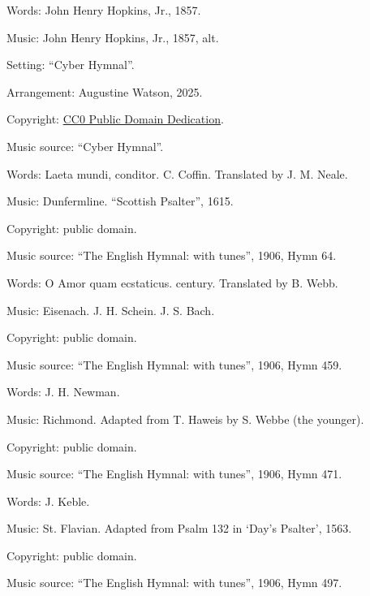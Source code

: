 \begin{multicols}{2}
\par\noindent
Words: John Henry Hopkins, Jr., 1857.
\par\noindent
Music: John Henry Hopkins, Jr., 1857, alt.
\par\noindent
Setting: ``Cyber Hymnal''.
\par\noindent
Arrangement: Augustine Watson, 2025.
\par\noindent
Copyright: \href{https://creativecommons.org/publicdomain/zero/1.0/}{CC0 Public Domain Dedication}.
\par\noindent
Music source: ``Cyber Hymnal''.

\par\noindent
Words: Laeta mundi, conditor. C. Coffin. Translated by J. M. Neale.
\par\noindent
Music: Dunfermline. ``Scottish Psalter'', 1615.
\par\noindent
Copyright: public domain.
\par\noindent
Music source: ``The English Hymnal: with tunes'', 1906, Hymn 64.

\par\noindent
Words: O Amor quam ecstaticus.  century. Translated by B. Webb.
\par\noindent
Music: Eisenach. J. H. Schein. J. S. Bach.
\par\noindent
Copyright: public domain.
\par\noindent
Music source: ``The English Hymnal: with tunes'', 1906, Hymn 459.

\par\noindent
Words: J. H. Newman.
\par\noindent
Music: Richmond. Adapted from T. Haweis by S. Webbe (the younger).
\par\noindent
Copyright: public domain.
\par\noindent
Music source: ``The English Hymnal: with tunes'', 1906, Hymn 471.

\par\noindent
Words: J. Keble.
\par\noindent
Music: St. Flavian. Adapted from Psalm 132 in `Day's Psalter', 1563.
\par\noindent
Copyright: public domain.
\par\noindent
Music source: ``The English Hymnal: with tunes'', 1906, Hymn 497.


\end{multicols}
